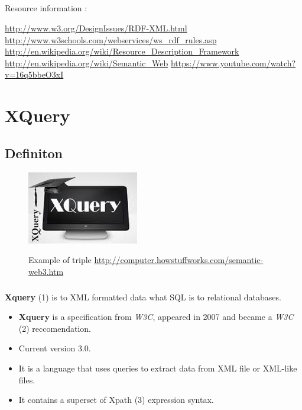 \documentclass[a4paper,11pt]{report}
\begin{document}
\paragraph{}
Resource information : 

\url{http://www.w3.org/DesignIssues/RDF-XML.html}
\url{http://www.w3schools.com/webservices/ws_rdf_rules.asp}
\url{http://en.wikipedia.org/wiki/Resource_Description_Framework}
\url{http://en.wikipedia.org/wiki/Semantic_Web}
\url{https://www.youtube.com/watch?v=16q5bbeO3xI}

\chapter{XQuery}

\section{Definiton}

\begin{figure}[h]
	\centering
		\includegraphics{images/xquery_image.jpeg}~\\[1cm]
		\caption {Example of triple \url {http://computer.howstuffworks.com/semantic-web3.htm}}
\end{figure}


\paragraph{}
\textbf{Xquery} {\footnotesize (1)} is to XML formatted data what SQL is to
relational databases.\\

\begin{itemize}
  \item \textbf{Xquery} is a specification from \textit{W3C}, appeared in 2007 and became a \textit{W3C} {\footnotesize (2)} reccomendation.
  \item Current version 3.0.
  \item It is a language that uses queries to extract data from XML file or XML-like files.
  \item It contains a superset of Xpath {\footnotesize (3)} expression syntax.
\end{itemize}
 
\end{document}
